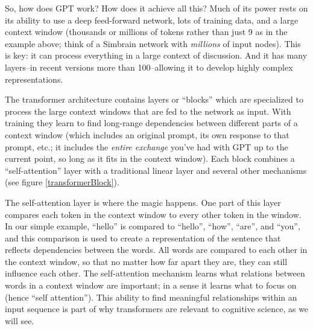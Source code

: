 So, how does GPT work? How does it achieve all this? Much of its power rests on its ability to use a deep feed-forward network, lots of training data, and a large context window (thousands or millions of tokens rather than just 9 as in the example above; think of a Simbrain network with \emph{millions} of input nodes). This is key: it can process everything in a large context of discussion.  And it has many layers--in recent versions more than 100--allowing it to develop highly complex representations.

The transformer architecture \cite{vaswani2017attention} contains layers or ``blocks'' which are specialized to process the large context windows that are fed to the network as input. With training they learn to find long-range dependencies between different parts of a context window (which includes an original prompt, its own response to that prompt, etc.; it includes the \emph{entire exchange} you've had with GPT up to the current point, so long as it fits in the context window).  Each block combines  a ``self-attention'' layer with a traditional linear layer and several other mechanisms (see figure \ref{transformerBlock}). 

The self-attention layer is where the magic happens.  One part of this layer compares each token in the context window to every other token in the window. In our simple example, ``hello'' is compared to ``hello'', ``how'', ``are'', and ``you'', and this comparison is used to create a representation of the sentence that reflects dependencies between the words. All words are compared to each other in the context window, so that no matter how far apart they are, they can still influence each other. The self-attention mechanism learns what relations between words in a context window are important; in a sense it learns what to focus on (hence ``self attention''). This ability to find meaningful relationships within an input sequence is part of why transformers are relevant to cognitive science, as we will see.

